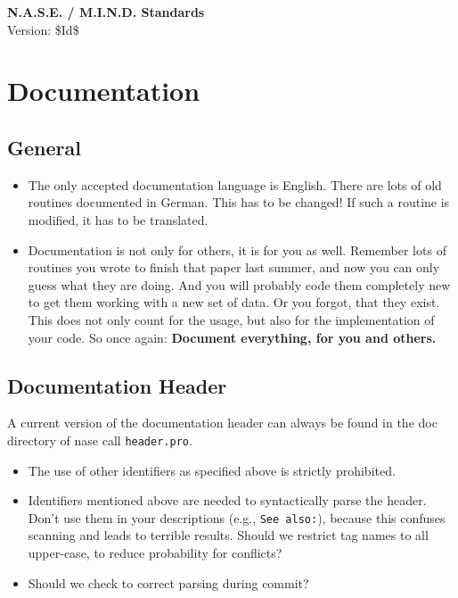 \documentclass[12pt]{article}
\begin{document}
\begin{titlepage}
\begin{center}
{\Huge\textbf{N.A.S.E. / M.I.N.D. Standards}\\[2cm]}
Version: \$Id$ $\$ 
\end{center}
\vfill
\tableofcontents
\vfill
\vfill
\end{titlepage}

\section{Documentation}
\subsection{General}
\begin{itemize}
\item The only accepted documentation language is English. There are lots of old routines documented in German. This has to be changed! If such a routine is modified, it has to be translated. 
\item Documentation is not only for others, it is for you as well. Remember lots of routines you wrote to finish that paper last summer, and now you can only guess what they are doing. And you will probably code them completely new to get them working with a new set of data. Or you forgot, that they exist. This does not only count for the usage, but also for the implementation of your code. So once again: \textbf{Document everything, for you and others.}
\end{itemize}

\subsection{Documentation Header}
A current version of the documentation header can always be found in the doc directory of nase call \texttt{header.pro}.



\begin{itemize}
\item The use of other identifiers as specified above is strictly prohibited.
\item Identifiers mentioned above are needed to syntactically parse the header. Don't use them in your descriptions (e.g., \texttt{See also:}), because this
      confuses scanning and leads to terrible results. Should we restrict tag names to all upper-case, to reduce probability for conflicts?
\item Should we check to correct parsing during commit?
\end{itemize}
\end{document}
